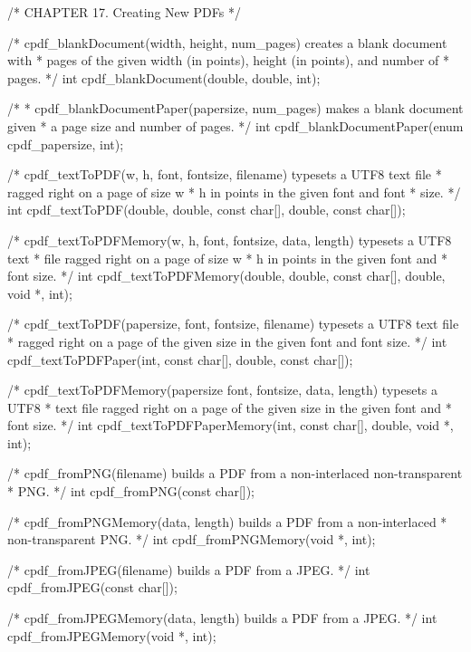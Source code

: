 /* CHAPTER 17. Creating New PDFs */

/* cpdf_blankDocument(width, height, num_pages) creates a blank document with
 * pages of the given width (in points), height (in points), and number of
 * pages.
 */
int cpdf_blankDocument(double, double, int);

/*
 * cpdf_blankDocumentPaper(papersize, num_pages) makes a blank document given
 * a page size and number of pages.
 */
int cpdf_blankDocumentPaper(enum cpdf_papersize, int);

/* cpdf_textToPDF(w, h, font, fontsize, filename) typesets a UTF8 text file
 * ragged right on a page of size w * h in points in the given font and font
 * size. */
int cpdf_textToPDF(double, double, const char[], double, const char[]);

/* cpdf_textToPDFMemory(w, h, font, fontsize, data, length) typesets a UTF8 text
 * file ragged right on a page of size w * h in points in the given font and
 * font size. */
int cpdf_textToPDFMemory(double, double, const char[], double, void *, int);

/* cpdf_textToPDF(papersize, font, fontsize, filename) typesets a UTF8 text file
 * ragged right on a page of the given size in the given font and font size. */
int cpdf_textToPDFPaper(int, const char[], double, const char[]);

/* cpdf_textToPDFMemory(papersize font, fontsize, data, length) typesets a UTF8
 * text file ragged right on a page of the given size in the given font and
 * font size. */
int cpdf_textToPDFPaperMemory(int, const char[], double, void *, int);

/* cpdf_fromPNG(filename) builds a PDF from a non-interlaced non-transparent
 * PNG. */
int cpdf_fromPNG(const char[]);

/* cpdf_fromPNGMemory(data, length) builds a PDF from a non-interlaced
 * non-transparent PNG. */
int cpdf_fromPNGMemory(void *, int);

/* cpdf_fromJPEG(filename) builds a PDF from a JPEG. */
int cpdf_fromJPEG(const char[]);

/* cpdf_fromJPEGMemory(data, length) builds a PDF from a JPEG. */
int cpdf_fromJPEGMemory(void *, int);

